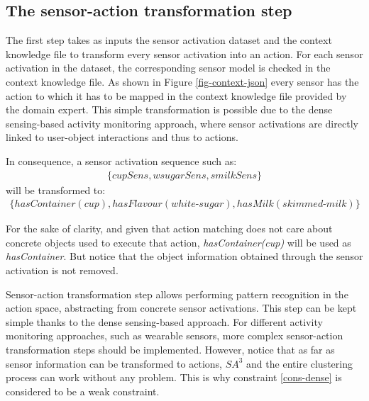 
\subsection{The sensor-action transformation step}
\label{subsec:clustering:sa3:transform}

The first step takes as inputs the sensor activation dataset and the context knowledge file to transform every sensor activation into an action. For each sensor activation in the dataset, the corresponding sensor model is checked in the context knowledge file. As shown in Figure \ref{fig-context-json} every sensor has the action to which it has to be mapped in the context knowledge file provided by the domain expert. This simple transformation is possible due to the dense sensing-based activity monitoring approach, where sensor activations are directly linked to user-object interactions and thus to actions. 

In consequence, a sensor activation sequence such as:
 \begin{equation*}
 \begin{split}
   \{cupSens, wsugarSens, smilkSens\}
 \end{split}  
 \end{equation*}
 will be transformed to:
 \begin{equation*}
 \begin{split}
  \{hasContainer(cup), hasFlavour(white\text{-}sugar), hasMilk(skimmed\text{-}milk)\}
 \end{split}   
 \end{equation*}
 
For the sake of clarity, and given that action matching does not care about concrete objects used to execute that action, \textit{hasContainer(cup)} will be used as \textit{hasContainer}. But notice that the object information obtained through the sensor activation is not removed. 

Sensor-action transformation step allows performing pattern recognition in the action space, abstracting from concrete sensor activations. This step can be kept simple thanks to the dense sensing-based approach. For different activity monitoring approaches, such as wearable sensors, more complex sensor-action transformation steps should be implemented. However, notice that as far as sensor information can be transformed to actions, $SA^3$ and the entire clustering process can work without any problem. This is why constraint \ref{cons-dense} is considered to be a weak constraint.

